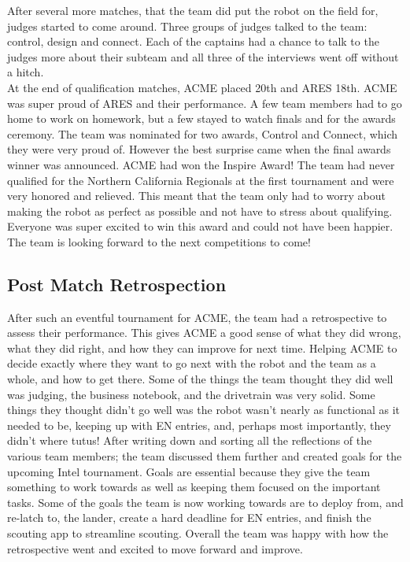 \documentclass{article}
\begin{document}
After several more matches, that the team did put the robot on the field for, judges started to come around. Three groups of judges talked to the team: control, design and connect. Each of the captains had a chance to talk to the judges more about their subteam and all three of the interviews went off without a hitch. \\

At the end of qualification matches, ACME placed 20th and ARES 18th. ACME was super proud of ARES and their performance. A few team members had to go home to work on homework, but a few stayed to watch finals and for the awards ceremony. The team was nominated for two awards, Control and Connect, which they were very proud of. However the best surprise came when the final awards winner was announced. ACME had won the Inspire Award! The team had never qualified for the Northern California Regionals at the first tournament and were very honored and relieved. This meant that the team only had to worry about making the robot as perfect as possible and not have to stress about qualifying. Everyone was super excited to win this award and could not have been happier. The team is looking forward to the next competitions to come!\\

\subsection{Post Match Retrospection}
After such an eventful tournament for ACME, the team had a retrospective to assess their performance. This gives ACME a good sense of what they did wrong, what they did right, and how they can improve for next time. Helping ACME to decide exactly where they want to go next with the robot and the team as a whole, and how to get there. Some of the things the team thought they did well was judging, the business notebook, and the drivetrain was very solid. Some things they thought didn’t go well was the robot wasn’t nearly as functional as it needed to be, keeping up with EN entries, and, perhaps most importantly, they didn’t where tutus! After writing down and sorting all the reflections of the various team members; the team discussed them further and created goals for the upcoming Intel tournament. Goals are essential because they give the team something to work towards as well as keeping them focused on the important tasks. Some of the goals the team is now working towards are to deploy from, and re-latch to, the lander, create a hard deadline for EN entries, and finish the scouting app to streamline scouting. Overall the team was happy with how the retrospective went and excited to move forward and improve. 
\end{document}
